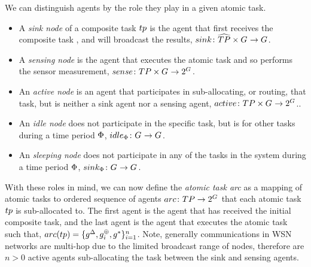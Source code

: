 \newcommand{\functionSenseRole}[2]{\functionSignature{sense}{\varAtomicTask{}{}, \setAgents{}{}}}
\newcommand{\functionActiveRole}[2]{\functionSignature{active}{\varAtomicTask{}{}, \setAgents{}{}}}
\newcommand{\functionIdleRole}[2]{\functionSignature{idle}{\varAtomicTask{}{}, \setAgents{}{}}}
\newcommand{\functionSleepRole}[2]{\functionSignature{sleep}{\varAtomicTask{}{}, \setAgents{}{}}}

We can distinguish agents by the role they play in a given atomic task.
\begin{itemize}
	\item A \textit{sink node} of a composite task $\varAtomicTask{}{}$ is the agent that first receives the composite task , and will broadcast the results, $\formalSinkRole{}{}$.
	\item A \textit{sensing node} is the agent that executes the atomic task and so performs the sensor measurement, $\formalSenseRole{}{}$.
	\item An \textit{active node} is an agent that participates in sub-allocating, or routing, that task, but is neither a sink agent nor a sensing agent, $\formalActiveRole{}{}$..
	\item An \textit{idle node} does not participate in the specific task, but is for other tasks during a time period $\Phi$, $\formalIdleRole{}{}$.
	\item An \textit{sleeping node} does not participate in any of the tasks in the system during a time period $\Phi$, $\formalSleepRole{}{}$.
\end{itemize}
With these roles in mind, we can now define the  \textit{atomic task arc} as a mapping of atomic tasks to ordered sequence of agents $\formalTaskArc{}{}$ that each atomic task $\varAtomicTask{}{}$ is sub-allocated to. The first agent is the agent that has received the initial composite task, and the last agent is the agent that executes the atomic task such that, 
$\functionTaskArc{}{} = \lbrace \varSinkAgent{}{}, \varActiveAgent{i}{}, \varSensingAgent{}{} \rbrace_{i=1}^{n}$. Note, generally communications in WSN networks are multi-hop due to the limited broadcast range of nodes, therefore are $n>0$ active agents sub-allocating the task between the sink and sensing agents.


